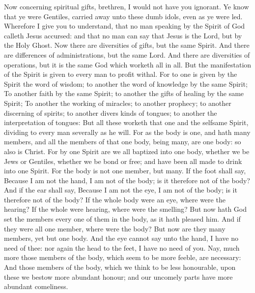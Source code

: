  Now concerning spiritual gifts, brethren, I would not
have you ignorant.  Ye know that ye were Gentiles, carried
away unto these dumb idols, even as ye were led. 
Wherefore I give you to understand, that no man speaking by the Spirit
of God calleth Jesus accursed: and that no man can say that Jesus is the
Lord, but by the Holy Ghost.  Now there are diversities of
gifts, but the same Spirit.  And there are differences of
administrations, but the same Lord.  And there are
diversities of operations, but it is the same God which worketh all in
all.  But the manifestation of the Spirit is given to
every man to profit withal.  For to one is given by the
Spirit the word of wisdom; to another the word of knowledge by the same
Spirit;  To another faith by the same Spirit; to another
the gifts of healing by the same Spirit;  To another the
working of miracles; to another prophecy; to another discerning of
spirits; to another divers kinds of tongues; to another the
interpretation of tongues:  But all these worketh that
one and the selfsame Spirit, dividing to every man severally as he will.
 For as the body is one, and hath many members, and all
the members of that one body, being many, are one body: so also is
Christ.  For by one Spirit are we all baptized into one
body, whether we be Jews or Gentiles, whether we be bond or free; and
have been all made to drink into one Spirit.  For the
body is not one member, but many.  If the foot shall say,
Because I am not the hand, I am not of the body; is it therefore not of
the body?  And if the ear shall say, Because I am not the
eye, I am not of the body; is it therefore not of the body?
 If the whole body were an eye, where were the hearing?
If the whole were hearing, where were the smelling?  But
now hath God set the members every one of them in the body, as it hath
pleased him.  And if they were all one member, where were
the body?  But now are they many members, yet but one
body.  And the eye cannot say unto the hand, I have no
need of thee: nor again the head to the feet, I have no need of you.
 Nay, much more those members of the body, which seem to
be more feeble, are necessary:  And those members of the
body, which we think to be less honourable, upon these we bestow more
abundant honour; and our uncomely parts have more abundant comeliness.

